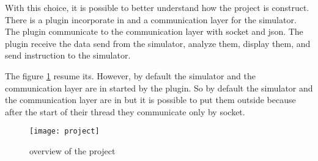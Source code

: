 With this choice, it is possible to better understand how the project is construct. There is a plugin incorporate in \umld and a communication layer for the simulator. The plugin communicate to the communication layer with socket and json. The plugin receive the data send from the simulator, analyze them, display them, and send instruction to the simulator.

The figure \ref{fig:project} resume its. However, by default the simulator and the communication layer are in started by the plugin. So by default the simulator and the communication layer are in \umld but it is possible to put them outside because after the start of their thread they communicate only by socket.

\begin{figure}[h]
  \centering
  \texttt{[image: project]}
  \caption{overview of the project}
  \label{fig:project}
\end{figure}



